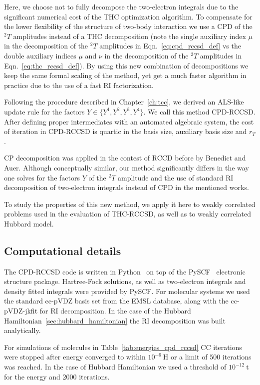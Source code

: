 Here, we choose not to fully decompose the two-electron 
integrals due to the significant numerical cost of the THC optimization 
algorithm. To compensate for the lower flexibility of the structure of 
two-body interaction we use a CPD of the ${}^2T$ amplitudes instead of a THC 
decomposition (note the single auxiliary index $\mu$ in the decomposition of 
the ${}^2T$ amplitudes in Eqn.~\ref{eq:cpd_rccsd_def} vs the double auxiliary 
indices $\mu$ and $\nu$ in the decomposition of the ${}^2T$ amplitudes in 
Eqn.~\ref{eq:thc_rccsd_def}). By using this new combination of decompositions 
we keep the same formal scaling of the method, yet get a much faster algorithm 
in practice due to the use of a fast RI factorization. 

Following the procedure described in Chapter~\ref{ch:tcc}, we derived 
an ALS-like update rule for the factors $Y \in \{Y^{1}, Y^{2}, Y^{3}, Y^{4}\}$. 
We call this method CPD-RCCSD. After defining proper intermediates with an 
automated algebraic system,\cite{drudge2} the cost of iteration in CPD-RCCSD is 
quartic in the basis size, auxiliary basis size and $r_{T}$.

CP decomposition was applied in the contest of RCCD before by Benedict and 
Auer.\cite{benedict_ccd, benedict_mp2} Although conceptually similar, our 
method significantly differs in the way one solves for the factors $Y$ of 
the ${}^2T$ amplitude and the use of standard RI decomposition of two-electron 
integrals instead of CPD in the mentioned works.

To study the properties of this new method, we apply it here to weakly 
correlated problems used in the evaluation of 
THC-RCCSD,\cite{schutski2017tensor} as well as to weakly correlated Hubbard 
model. 

\subsection{Computational details}
The CPD-RCCSD code is written in Python~\cite{van2007python} on top of the 
PySCF~\cite{sun2017python} electronic structure package. Hartree-Fock 
solutions, as well as two-electron integrals and density fitted integrals were 
provided by PySCF. For molecular systems we used the standard cc-pVDZ basis set 
from the EMSL database,\cite{schuchardt2007basis} along with the cc-pVDZ-jkfit 
for RI decomposition. In the case of the Hubbard 
Hamiltonian~\ref{sec:hubbard_hamiltonian}
the RI decomposition was built analytically.

For simulations of molecules in Table~\ref{tab:energies_cpd_rccsd} CC iterations 
were stopped after energy converged to within $10^{-6}~\mathrm{H}$ or a limit 
of 500 iterations was reached. In the case of Hubbard Hamiltonian we used a 
threshold of $10^{-12}~\mathrm{t}$ for the energy and 2000 iterations.

